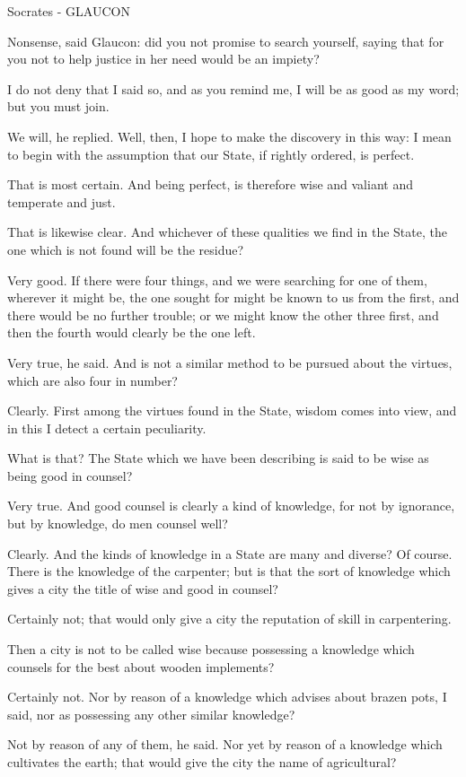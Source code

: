 Socrates - GLAUCON

Nonsense, said Glaucon: did you not promise to search yourself, saying that for you not to help justice in her need would be an impiety?

I do not deny that I said so, and as you remind me, I will be as good as my word; but you must join.

We will, he replied.
Well, then, I hope to make the discovery in this way: I mean to begin with the assumption that our State, if rightly ordered, is perfect.

That is most certain.
And being perfect, is therefore wise and valiant and temperate and just.

That is likewise clear.
And whichever of these qualities we find in the State, the one which is not found will be the residue?

Very good.
If there were four things, and we were searching for one of them, wherever it might be, the one sought for might be known to us from the first, and there would be no further trouble; or we might know the other three first, and then the fourth would clearly be the one left.

Very true, he said.
And is not a similar method to be pursued about the virtues, which are also four in number?

Clearly.
First among the virtues found in the State, wisdom comes into view, and in this I detect a certain peculiarity.

What is that?
The State which we have been describing is said to be wise as being good in counsel?

Very true.
And good counsel is clearly a kind of knowledge, for not by ignorance, but by knowledge, do men counsel well?

Clearly.
And the kinds of knowledge in a State are many and diverse?
Of course.
There is the knowledge of the carpenter; but is that the sort of knowledge which gives a city the title of wise and good in counsel?

Certainly not; that would only give a city the reputation of skill in carpentering.

Then a city is not to be called wise because possessing a knowledge which counsels for the best about wooden implements?

Certainly not.
Nor by reason of a knowledge which advises about brazen pots, I said, nor as possessing any other similar knowledge?

Not by reason of any of them, he said.
Nor yet by reason of a knowledge which cultivates the earth; that would give the city the name of agricultural?

